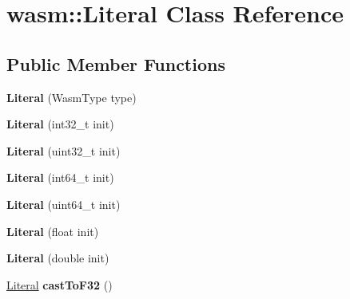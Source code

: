\hypertarget{classwasm_1_1_literal}{}\section{wasm\+:\+:Literal Class Reference}
\label{classwasm_1_1_literal}
\subsection*{Public Member Functions}
\begin{DoxyCompactItemize}
\item 
\mbox{\label{classwasm_1_1_literal_a3a08c59fb2a60be4e2a7c3c1eb0d82bb}} 
{\bfseries Literal} (Wasm\+Type type)
\item 
\mbox{\label{classwasm_1_1_literal_ab4750e5138af02f799e3ba7b071bc271}} 
{\bfseries Literal} (int32\+\_\+t init)
\item 
\mbox{\label{classwasm_1_1_literal_abc8a141a79dc08eec3e76b8c1802796b}} 
{\bfseries Literal} (uint32\+\_\+t init)
\item 
\mbox{\label{classwasm_1_1_literal_a738b14e5a66cc878665fa576e626a405}} 
{\bfseries Literal} (int64\+\_\+t init)
\item 
\mbox{\label{classwasm_1_1_literal_a1528c49672b1af69651ded9a83d5abc5}} 
{\bfseries Literal} (uint64\+\_\+t init)
\item 
\mbox{\label{classwasm_1_1_literal_a10cd6fcd9598d3e4d43ffd08ef47dfd6}} 
{\bfseries Literal} (float init)
\item 
\mbox{\label{classwasm_1_1_literal_a5fb2794bef74ca511faa29434e2ea291}} 
{\bfseries Literal} (double init)
\item 
\mbox{\label{classwasm_1_1_literal_a9df9e77c0abc470da36e25353d643228}} 
\mbox{\hyperlink{classwasm_1_1_literal}{Literal}} {\bfseries cast\+To\+F32} ()
\item 
\mbox{\label{classwasm_1_1_literal_a692bc6dd2f3dce26d448d0368fd556e0}} 

\end{DoxyCompactItemize}
